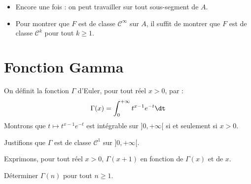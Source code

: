 \documentclass[a4paper,10pt]{report}
\begin{document}
\begin{Remarques}{}
\begin{itemize}
\item Encore une fois : on peut travailler sur tout sous-segment de $A$.
\item Pour montrer que $F$ est de classe $\mathcal{C}^{\infty}$ sur $A$, il suffit de montrer que $F$ est de classe $\mathcal{C}^k$ pour tout $k \geq 1$.
\end{itemize}
\end{Remarques}{}
\section{Fonction Gamma}
On définit la fonction $\Gamma$ d'Euler, pour tout réel $x>0$, par :
$$ \Gamma(x) = \int_{0}^{+ \infty} t^{x-1} e^{-t} \dt$$
Montrons que $t \mapsto  t^{x-1} e^{-t}$ est intégrable sur $]0, + \infty[$ si et seulement si $x>0$.

\vspace{6cm}

\newpage

Justifions que $\Gamma$ est de classe $\mathcal{C}^1$ sur $]0, + \infty[$.

\vspace{13cm}



Exprimons, pour tout réel $x>0$, $\Gamma(x+1)$ en fonction de $\Gamma(x)$ et de $x$.

\vspace{7cm}



Déterminer $\Gamma(n)$ pour tout $n \geq 1$.

\vspace{5cm}
\end{document}

